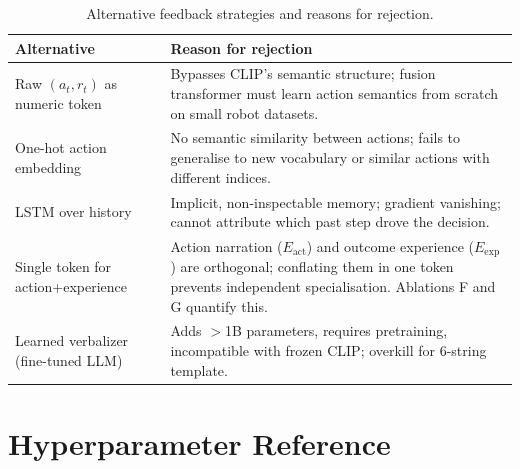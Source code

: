 \documentclass{article}
\newcommand{\Lact}{$E_{\mathrm{act}}$\xspace}   %
\newcommand{\Lexp}{$E_{\mathrm{exp}}$\xspace}   %
\begin{document}
\begin{table}[h]
\centering
\caption{Alternative feedback strategies and reasons for rejection.}
\label{tab:alternatives}
\small
\begin{tabular}{L{4cm}L{8.5cm}}
\toprule
\textbf{Alternative} & \textbf{Reason for rejection} \\
\midrule
Raw $(a_t,r_t)$ as numeric token &
  Bypasses CLIP's semantic structure; fusion transformer must learn
  action semantics from scratch on small robot datasets. \\
One-hot action embedding &
  No semantic similarity between actions; fails to generalise to
  new vocabulary or similar actions with different indices. \\
LSTM over history &
  Implicit, non-inspectable memory; gradient vanishing; cannot
  attribute which past step drove the decision. \\
Single token for action+experience &
  Action narration (\Lact) and outcome experience (\Lexp) are orthogonal;
  conflating them in one token prevents independent specialisation.
  Ablations F and G quantify this. \\
Learned verbalizer (fine-tuned LLM) &
  Adds $>$1B parameters, requires pretraining, incompatible with
  frozen CLIP; overkill for 6-string template. \\
\bottomrule
\end{tabular}
\end{table}

\section{Hyperparameter Reference}
\label{app:hparams}
\end{document}

